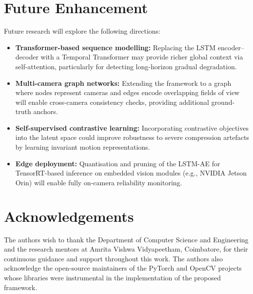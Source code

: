 \documentclass[runningheads]{llncs}
\begin{document}
\section{Future Enhancement}
Future research will explore the following directions:
\begin{itemize}
    \item \textbf{Transformer-based sequence modelling:} Replacing the
          LSTM encoder--decoder with a Temporal Transformer may provide
          richer global context via self-attention, particularly for
          detecting long-horizon gradual degradation.
    \item \textbf{Multi-camera graph networks:} Extending the framework
          to a graph where nodes represent cameras and edges encode
          overlapping fields of view will enable cross-camera consistency
          checks, providing additional ground-truth anchors.
    \item \textbf{Self-supervised contrastive learning:} Incorporating
          contrastive objectives into the latent space could improve
          robustness to severe compression artefacts by learning invariant
          motion representations.
    \item \textbf{Edge deployment:} Quantisation and pruning of the
          LSTM-AE for TensorRT-based inference on embedded vision modules
          (e.g., NVIDIA Jetson Orin) will enable fully on-camera
          reliability monitoring.
\end{itemize}

\section*{Acknowledgements}
The authors wish to thank the Department of Computer Science and
Engineering and the research mentors at Amrita Vishwa Vidyapeetham,
Coimbatore, for their continuous guidance and support throughout this
work. The authors also acknowledge the open-source maintainers of the
PyTorch and OpenCV projects whose libraries were instrumental in the
implementation of the proposed framework.
\end{document}
